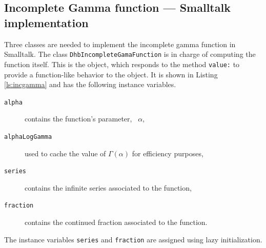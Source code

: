 \documentclass[twoside]{book}
\begin{document}
\subsection{Incomplete Gamma function --- Smalltalk  implementation}
\label{sec:sincgamma} Three classes are
needed to implement the incomplete gamma function in Smalltalk.
The class {\tt DhbIncompleteGamaFunction} is in charge of
computing the function itself. This is the object, which responds
to the method {\tt value:} to provide a function-like behavior to
the object. It is shown in Listing \ref{ls:incgamma} and has the
following instance variables.
\begin{description}
\item[\tt alpha]contains the function's parameter, \ie\ $\alpha$,
\item[\tt alphaLogGamma]used to cache the value of $\Gamma\left(\alpha\right)$ for efficiency
purposes,
\item[\tt series]contains the infinite series associated to the function,
\item[\tt fraction]contains the continued fraction  associated to the
function.
\end{description}
The instance variables {\tt series} and {\tt fraction} are
assigned using lazy initialization.
\end{document}
